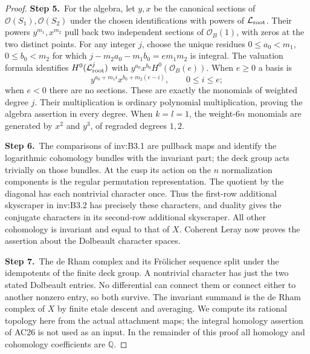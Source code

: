\begin{proof}
\par\smallskip\noindent\textbf{Step 5.}\ For the algebra, let $y,x$ be the canonical sections of
$\mathcal O(S_1),\mathcal O(S_2)$ under the chosen identifications with powers of
$\mathcal L_{\rm root}$. Their powers $y^{m_1},x^{m_2}$ pull back two independent
sections of $\mathcal O_B(1)$, with zeros at the two distinct points.
For any integer $j$, choose the unique residues
$0\le a_0<m_1$, $0\le b_0<m_2$ for which
$j-m_2a_0-m_1b_0=e m_1m_2$ is integral.
The valuation formula identifies $H^0(\mathcal L_{\rm root}^j)$ with
$y^{a_0}x^{b_0}H^0(\mathcal O_B(e))$. When $e\ge0$ a basis is
\[
y^{a_0+m_1i}x^{b_0+m_2(e-i)},\qquad0\le i\le e;
\]
when $e<0$ there are no sections. These are exactly the monomials of
weighted degree $j$. Their multiplication is ordinary polynomial
multiplication, proving the algebra assertion in every degree.
When $k=l=1$, the weight-$6n$ monomials are generated by $x^2$ and
$y^3$, of regraded degrees $1,2$.

\par\smallskip\noindent\textbf{Step 6.}\ The comparisons of inv:B3.1 are pullback maps and identify the logarithmic
cohomology bundles with the invariant part; the deck group acts
trivially on those bundles. At the cusp its action on the $n$
normalization components is the regular permutation representation.
The quotient by the diagonal has each nontrivial character once.
Thus the first-row additional skyscraper in inv:B3.2 has precisely these
characters, and duality gives the conjugate characters in its
second-row additional skyscraper. All other cohomology is invariant
and equal to that of $X$. Coherent Leray now proves the assertion
about the Dolbeault character spaces.

\par\smallskip\noindent\textbf{Step 7.}\ The de Rham complex and its Fr\"olicher sequence split under the
idempotents of the finite deck group. A nontrivial character has just
the two stated Dolbeault entries. No differential can connect them
or connect either to another nonzero entry, so both survive.
The invariant summand is the de Rham complex of $X$ by finite
etale descent and averaging. We compute its rational topology here
from the actual attachment maps; the integral homology assertion
of AC26 is not used as an input. In the remainder of this proof
all homology and cohomology coefficients are $\mathbb Q$.


\end{proof}
